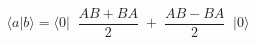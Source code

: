 \begin{equation}
\langle a \vert b\rangle = \langle 0\vert \;\; \frac{ AB+BA}{2} \; +\;
\frac {AB-BA}{2} \;\; \vert 0\rangle
\label{eq:decomp}
\end{equation}


